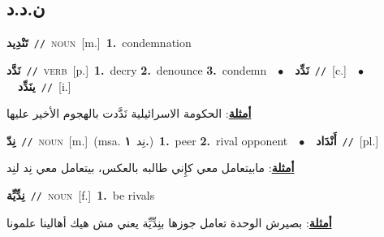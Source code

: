 \documentclass[10pt,a4paper,twoside]{article} %
\begin{document}
\begin{multicols}{2}
\vspace{-3mm}
\subsection*{\color{blue}\foreignlanguage{arabic}{ن.د.د}\color{blue}{}} 

{\setlength\topsep{0pt}\textbf{\foreignlanguage{arabic}{تَنْدِيد}}\ {\color{gray}\texttt{//}\color{black}}\ \textsc{noun}\ [m.]\ \textbf{1.}~condemnation\ } \vspace{2mm}

{\setlength\topsep{0pt}\textbf{\foreignlanguage{arabic}{نَدَّد}}\ {\color{gray}\texttt{//}\color{black}}\ \textsc{verb}\ [p.]\ \textbf{1.}~decry  \textbf{2.}~denounce  \textbf{3.}~condemn\ \ $\bullet$\ \ \setlength\topsep{0pt}\textbf{\foreignlanguage{arabic}{نَدِّد}}\ {\color{gray}\texttt{//}\color{black}}\ [c.]\ \ $\bullet$\ \ \setlength\topsep{0pt}\textbf{\foreignlanguage{arabic}{ينَدِّد}}\ {\color{gray}\texttt{//}\color{black}}\ [i.]\  \begin{flushright}\color{gray}\foreignlanguage{arabic}{\textbf{\underline{\foreignlanguage{arabic}{أمثلة}}}: الحكومة الاسرائيلية نَدَّدت بالهجوم الأخير عليها}\end{flushright}\color{black}} \vspace{2mm}

{\setlength\topsep{0pt}\textbf{\foreignlanguage{arabic}{نِدّ}}\ {\color{gray}\texttt{//}\color{black}}\ \textsc{noun}\ [m.]\ \color{gray}(msa. \foreignlanguage{arabic}{نِد}~\foreignlanguage{arabic}{\textbf{١.}})\color{black}\ \textbf{1.}~peer  \textbf{2.}~rival opponent\ \ $\bullet$\ \ \setlength\topsep{0pt}\textbf{\foreignlanguage{arabic}{أَنْدَاد}}\ {\color{gray}\texttt{//}\color{black}}\ [pl.]\  \begin{flushright}\color{gray}\foreignlanguage{arabic}{\textbf{\underline{\foreignlanguage{arabic}{أمثلة}}}: مابيتعامل معي كإِني طالبه بالعكس، بيتعامل معي نِد لنِد}\end{flushright}\color{black}} \vspace{2mm}

{\setlength\topsep{0pt}\textbf{\foreignlanguage{arabic}{نِدِّيِّة}}\ {\color{gray}\texttt{//}\color{black}}\ \textsc{noun}\ [f.]\ \textbf{1.}~be rivals\  \begin{flushright}\color{gray}\foreignlanguage{arabic}{\textbf{\underline{\foreignlanguage{arabic}{أمثلة}}}: بصيرش الوحدة تعامل جوزها بنِدِّيِّة يعني مش هيك أهالينا علمونا}\end{flushright}\color{black}} \vspace{2mm}


\end{multicols}
\end{document}
